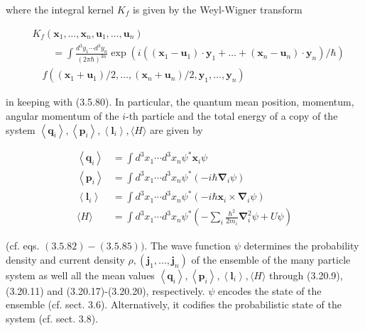\documentclass{article}
\begin{document}
where the integral kernel $K_{f}$ is given by the Weyl-Wigner transform
 
\begin{align*}
& K_{f}\left(\boldsymbol{x}_{1}, \ldots, \boldsymbol{x}_{n}, \boldsymbol{u}_{1}, \ldots, \boldsymbol{u}_{n}\right)  \tag{3.20.16}\\
& \qquad=\int \frac{d^{3} y_{1} \cdots d^{3} y_{n}}{(2 \pi \hbar)^{3 n}} \exp \left(i\left(\left(\boldsymbol{x}_{1}-\boldsymbol{u}_{1}\right) \cdot \boldsymbol{y}_{1}+\ldots+\left(\boldsymbol{x}_{n}-\boldsymbol{u}_{n}\right) \cdot \boldsymbol{y}_{n}\right) / \hbar\right) \\
& \quad f\left(\left(\boldsymbol{x}_{1}+\boldsymbol{u}_{1}\right) / 2, \ldots,\left(\boldsymbol{x}_{n}+\boldsymbol{u}_{n}\right) / 2, \boldsymbol{y}_{1}, \ldots, \boldsymbol{y}_{n}\right)
\end{align*}
 
in keeping with (3.5.80). In particular, the quantum mean position, momentum, angular momentum of the $i$-th particle and the total energy of a copy of the system $\left\langle\boldsymbol{q}_{i}\right\rangle,\left\langle\boldsymbol{p}_{i}\right\rangle,\left\langle\boldsymbol{l}_{i}\right\rangle,\langle H\rangle$ are given by
 
\begin{align*}
\left\langle\boldsymbol{q}_{i}\right\rangle & =\int d^{3} x_{1} \cdots d^{3} x_{n} \psi^{*} \boldsymbol{x}_{i} \psi  \tag{3.20.17}\\
\left\langle\boldsymbol{p}_{i}\right\rangle & =\int d^{3} x_{1} \cdots d^{3} x_{n} \psi^{*}\left(-i \hbar \boldsymbol{\nabla}_{i} \psi\right)  \tag{3.20.18}\\
\left\langle\boldsymbol{l}_{i}\right\rangle & =\int d^{3} x_{1} \cdots d^{3} x_{n} \psi^{*}\left(-i \hbar \boldsymbol{x}_{i} \times \boldsymbol{\nabla}_{i} \psi\right)  \tag{3.20.19}\\
\langle H\rangle & =\int d^{3} x_{1} \cdots d^{3} x_{n} \psi^{*}\left(-\sum_{i} \frac{\hbar^{2}}{2 m_{i}} \boldsymbol{\nabla}_{i}^{2} \psi+U \psi\right) \tag{3.20.20}
\end{align*}
 
(cf. eqs. $(3.5 .82)-(3.5 .85))$.
The wave function $\psi$ determines the probability density and current density
$\rho,\left(\boldsymbol{j}_{1}, \ldots, \boldsymbol{j}_{n}\right)$ of the ensemble of the many particle system as well all the mean values $\left\langle\boldsymbol{q}_{i}\right\rangle,\left\langle\boldsymbol{p}_{i}\right\rangle,\left\langle\boldsymbol{l}_{i}\right\rangle,\langle H\rangle$ through (3.20.9), (3.20.11) and (3.20.17)-(3.20.20), respectively. $\psi$ encodes the state of the ensemble (cf. sect. 3.6). Alternatively, it codifies the probabilistic state of the system (cf. sect. 3.8).
\end{document}
